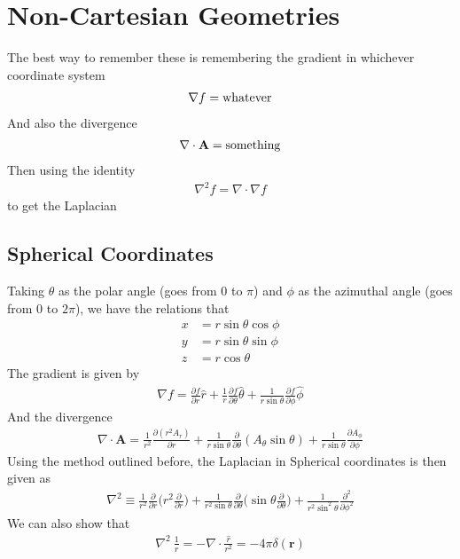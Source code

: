 \section{Non-Cartesian Geometries}

The best way to remember these is remembering the gradient in whichever coordinate system
\begin{align}
\nabla f = \rm{whatever}
\end{align}
And also the divergence
\begin{align}
\nabla\cdot\textbf{A} = \rm{something}
\end{align}
Then using the identity
\begin{align}
\nabla^2 f = \nabla\cdot\nabla f
\end{align}
to get the Laplacian


\subsection{Spherical Coordinates}\label{sphere}
Taking $\theta$ as the polar angle (goes from 0 to $\pi$) and $\phi$ as the azimuthal angle (goes from $0$ to $2\pi$), we have the relations that
\begin{align}\label{sphere}
x &= r\sin\theta\cos\phi\\
y &= r\sin\theta\sin\phi\\
z &= r\cos\theta
\end{align}
The gradient is given by
\begin{align}
\nabla f = \frac{\partial f}{\partial r}\hat{r} +\frac{1}{r}\frac{\partial f}{\partial \theta}\hat{\theta} + \frac{1}{r\sin\theta}\frac{\partial f}{\partial\phi}\hat{\phi}
\end{align}
And the divergence
\begin{align}
\nabla\cdot\textbf{A} = \frac{1}{r^2}\frac{\partial(r^2A_r)}{\partial r} + \frac{1}{r\sin\theta}\frac{\partial}{\partial\theta}(A_\theta\sin\theta) + \frac{1}{r\sin\theta}\frac{\partial A_\phi}{\partial\phi}
\end{align}
Using the method outlined before, the Laplacian in Spherical coordinates is then given as
\begin{align}
\nabla^2\equiv \frac{1}{r^2} \frac{\partial}{\partial r}\Big(r^2\frac{\partial}{\partial r}\Big) + \frac{1}{r^2\sin\theta}\frac{\partial}{\partial\theta}\Big(\sin\theta\frac{\partial}{\partial\theta}\Big) +\frac{1}{r^2\sin^2\theta}\frac{\partial^2}{\partial\phi^2} 
\end{align}
We can also show that 
\begin{align}\label{dirac}
\boxed{\nabla^2 ~\frac{1}{r}= -\nabla\cdot\frac{\hat{r}}{r^2} = -4\pi\delta(\textbf{r})}
\end{align}

